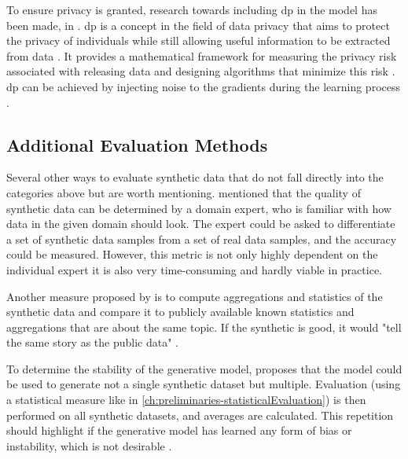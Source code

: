 To ensure privacy is granted, research towards including \gls{dp} \cite{dwork2008DifferentialPrivacySurvey} in the model has been made, \eg in \cite{xie2018DifferentiallyPrivateGenerative, jordon2018PATEGANGeneratingSynthetic, torfi2022DifferentiallyPrivateSynthetic}.
\gls{dp} is a concept in the field of data privacy that aims to protect the privacy of individuals while still allowing useful information to be extracted from data \cite{dwork2008DifferentialPrivacySurvey}. 
It provides a mathematical framework for measuring the privacy risk associated with releasing data and designing algorithms that minimize this risk \cite{dwork2008DifferentialPrivacySurvey, zhao2022CTABGANEnhancingTabular}.
\gls{dp} can be achieved by injecting noise to the gradients during the learning process \cite{xie2018DifferentiallyPrivateGenerative}.

\subsection{Additional Evaluation Methods}
\label{ch:preliminaries-evaluationOfSyntheticTabularData-otherMetrics}

Several other ways to evaluate synthetic data that do not fall directly into the categories above but are worth mentioning.
\cite{elemam2020SevenWaysEvaluate} mentioned that the quality of synthetic data can be determined by a domain expert, 
who is familiar with how data in the given domain should look.
The expert could be asked to differentiate a set of synthetic data samples from a set of real data samples, and the accuracy could be measured.
However, this metric is not only highly dependent on the individual expert it is also very time-consuming and hardly viable in practice.

Another measure proposed by \cite{elemam2020SevenWaysEvaluate} is to compute aggregations and statistics of the synthetic data and compare it to publicly available known statistics and aggregations that are about the same topic.
If the synthetic is good, it would "tell the same story as the public data" \cite[p. 58]{elemam2020SevenWaysEvaluate}.

To determine the stability of the generative model, \cite{elemam2020SevenWaysEvaluate} proposes that the model could be used to generate not a single synthetic dataset but multiple.
Evaluation (\eg using a statistical measure like in \autoref{ch:preliminaries-statisticalEvaluation}) is then performed on all synthetic datasets, and averages are calculated.
This repetition should highlight if the generative model has learned any form of bias or instability, which is not desirable \cite{elemam2020SevenWaysEvaluate}.

